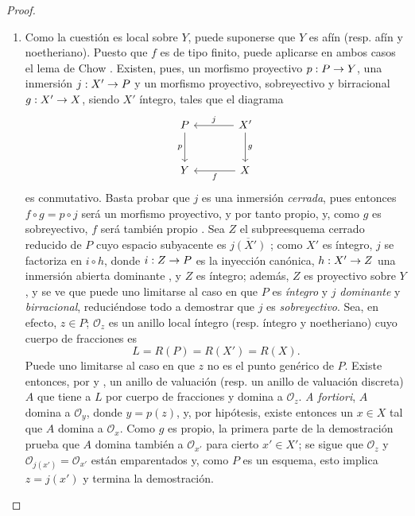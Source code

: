 \documentclass[oneside,10pt]{amsart}
\makeatletter
\newcommand{\ega@arrow}[2]{\mathchoice{#1}{#2}{#2}{#2}}
\renewcommand{\to}{\ega@arrow{\longrightarrow}{\rightarrow}}
\newcommand{\oldpage}[2][]{\marginnote{\normalfont\footnotesize\textbf{#1}~|~#2}\ignorespaces}
\makeatother
\begin{document}
\begin{proof}
\begin{enumerate}
  \item[\rm{(ii)}] Como la cuestión es local sobre $Y$, puede suponerse que $Y$ es afín (resp. afín y noetheriano).
  Puesto que $f$ es de tipo finito, puede aplicarse en ambos casos el lema de Chow .
  Existen, pues, un morfismo proyectivo $p:P\to Y$, una inmersión $j:X'\to P$ y un morfismo proyectivo, sobreyectivo y birracional $g:X'\to X$, siendo $X'$ íntegro, tales que el diagrama
  \[
\begin{tikzcd}[column sep=large,row sep=large]
P \arrow[d,"p"'] & X' \arrow[l,"j"'] \arrow[d,"g"] \\
Y & X \arrow[l,"f"]
\end{tikzcd}
\]
  es conmutativo.
  Basta probar que $j$ es una inmersión \emph{cerrada}, pues entonces $f\circ g=p\circ j$ será un morfismo proyectivo, y por tanto propio, y, como $g$ es sobreyectivo, $f$ será también propio .
  Sea $Z$ el subpreesquema cerrado reducido de $P$ cuyo espacio subyacente es $\overline{j(X')}$ ;
  como $X'$ es íntegro, $j$ se factoriza en $i\circ h$, donde $i:Z\to P$ es la inyección canónica, $h:X'\to Z$ una inmersión abierta dominante , y $Z$ es íntegro;
\oldpage[II]{147}
  además, $Z$ es proyectivo sobre $Y$, y se ve que puede uno limitarse al caso en que $P$ es \emph{íntegro} y $j$ \emph{dominante} y \emph{birracional}, reduciéndose todo a demostrar que $j$ es \emph{sobreyectivo}.
  Sea, en efecto, $z\in P$;
  $\mathcal{O}_z$ es un anillo local íntegro (resp. íntegro y noetheriano) cuyo cuerpo de fracciones es
  \[
L=R(P)=R(X')=R(X).
\]
  Puede uno limitarse al caso en que $z$ no es el punto genérico de $P$.
  Existe entonces, por  y , un anillo de valuación (resp. un anillo de valuación discreta) $A$ que tiene a $L$ por cuerpo de fracciones y domina a $\mathcal{O}_z$.
  \emph{A fortiori}, $A$ domina a $\mathcal{O}_y$, donde $y=p(z)$, y, por hipótesis, existe entonces un $x\in X$ tal que $A$ domina a $\mathcal{O}_x$.
  Como $g$ es propio, la primera parte de la demostración prueba que $A$ domina también a $\mathcal{O}_{x'}$ para cierto $x'\in X'$;
  se sigue que $\mathcal{O}_z$ y $\mathcal{O}_{j(x')}=\mathcal{O}_{x'}$ están emparentados  y, como $P$ es un esquema, esto implica $z=j(x')$  y termina la demostración.
\end{enumerate}
\end{proof}
\end{document}
